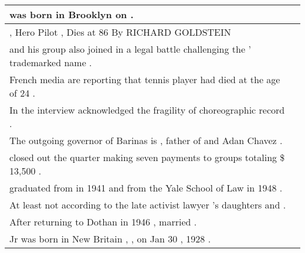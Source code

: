 \begin{longtable}{p{} P{1,4cm} }
\hline
{} {\underline{} was born in Brooklyn on \underline{} .} &    \\ 
\hline
{} {\underline{} \underline{} , Hero Pilot , Dies at 86 By RICHARD GOLDSTEIN} &    \\ 
\hline
{} {\underline{} and his group also joined in a legal battle challenging the \underline{} ' trademarked name .} &    \\ 
\hline
{} {French media are reporting that \underline{} tennis player \underline{} had died at the age of 24 .} &    \\ 
\hline
{} {In the interview \underline{} acknowledged the fragility of \underline{} choreographic record .} &    \\ 
\hline
{} {The outgoing governor of Barinas is \underline{} , father of \underline{} and Adan Chavez .} &    \\ 
\hline
{} {\underline{} closed out the quarter making seven payments to \underline{} groups totaling \$ 13,500 .} &    \\ 
\hline
{} {\underline{} graduated from \underline{} in 1941 and from the Yale School of Law in 1948 .} &    \\ 
\hline
{} {At least not according to the late activist lawyer 's daughters \underline{} and \underline{} .} &    \\ 
\hline
{} {After returning to Dothan in 1946 , \underline{} married \underline{} .} &    \\ 
\hline
{} {\underline{} Jr was born in New Britain , \underline{} , on Jan 30 , 1928 .} &    \\ 

\end{longtable}
